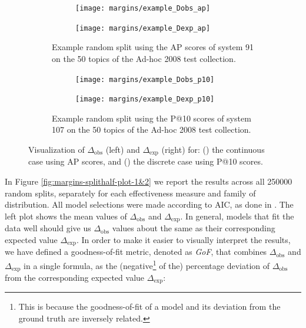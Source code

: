 \begin{figure}[t]
	\centering
	\begin{subfigure}{\textwidth}
		\centering
		\begin{subfigure}{.4\textwidth}
			\centering
			\texttt{[image: margins/example\_Dobs\_ap]}
		\end{subfigure}%
		\begin{subfigure}{.4\textwidth}
			\centering
			\texttt{[image: margins/example\_Dexp\_ap]}
		\end{subfigure}
		\caption{Example random split using the AP scores of system 91 on the 50 topics of the Ad-hoc 2008 test collection.}
		\label{fig:example-m-computations-ap}
	\end{subfigure}
	
	\begin{subfigure}{\textwidth}
		\centering
		\begin{subfigure}{.4\textwidth}
			\centering
			\texttt{[image: margins/example\_Dobs\_p10]}
		\end{subfigure}%
		\begin{subfigure}{.4\textwidth}
			\centering
			\texttt{[image: margins/example\_Dexp\_p10]}
		\end{subfigure}
		\caption{Example random split using the P@10 scores of system 107 on the 50 topics of the Ad-hoc 2008 test collection.}
		\label{fig:example-m-computations-p10}
	\end{subfigure}	
	
	\caption{Visualization of $\Delta_{\text{obs}}$ (left) and $\Delta_{\text{exp}}$ (right) for: () the continuous case using AP scores, and () the discrete case using P@10 scores.}
	\label{fig:example-m-delta-computations}
\end{figure}

In Figure \ref{fig:margins-splithalf-plot-1&2} we report the results across all \num{250000} random splits, separately for each effectiveness measure and family of distribution. All model selections were made according to AIC, as done in \cite{Urbano2019}. The left plot shows the mean values of $\Delta_{\text{obs}}$ and $\Delta_{\text{exp}}$. In general, models that fit the data well should give us $\Delta_{\text{obs}}$ values about the same as their corresponding expected value $\Delta_{\text{exp}}$. In order to make it easier to visually interpret the results, we have defined a goodness-of-fit metric, denoted as \textit{GoF}, that combines $\Delta_{\text{obs}}$ and $\Delta_{\text{exp}}$ in a single formula, as the (negative\footnote{This is because the goodness-of-fit of a model and its deviation from the ground truth are inversely related.} of the) percentage deviation of $\Delta_\text{obs}$ from the corresponding expected value $\Delta_\text{exp}$:

